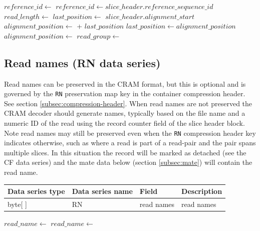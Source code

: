 \documentclass[a4paper]{article}
\begin{document}
\vskip 20pt
\begin{algorithmic}[1]
  \State $reference\_id\gets$ 
\Else
  \State $reference\_id\gets slice\_header.reference\_sequence\_id$
\EndIf
\State $read\_length \gets$ 
        \State $last\_position\gets$ $slice\_header.alignment\_start$
    \EndIf
    \State $alignment\_position \gets$  + $last\_position$
    \State $last\_position \gets alignment\_position$
\Else
    \State $alignment\_position \gets$ 
\EndIf
\State $read\_group \gets$ 
\EndProcedure
\end{algorithmic}

\subsection{Read names (RN data series)}
\label{subsec:names}

Read names can be preserved in the CRAM format, but this is optional and is governed by the \texttt{RN} preservation map key in the container compression header. See section \ref{subsec:compression-header}.
When read names are not preserved the CRAM decoder should generate names, typically based on the file name and a numeric ID of the read using the record counter field of the slice header block.
Note read names may still be preserved even when the \texttt{RN} compression header key indicates otherwise, such as where a read is part of a read-pair and the pair spans multiple slices.
In this situation the record will be marked as detached (see the CF data series) and the mate data below (section \ref{subsec:mate}) will contain the read name.

\begin{tabular}{|>{\raggedright}p{70pt}|>{\raggedright}p{75pt}|>{\raggedright}p{90pt}|>{\raggedright}p{171pt}|}
\hline
\textbf{Data series type} & \textbf{Data series name} & \textbf{Field} & \textbf{Description}\tabularnewline
\hline
byte[ ] & RN & read names & read names\tabularnewline
\hline
\end{tabular}

\vskip 20pt
\begin{algorithmic}[1]
  \State $read\_name \gets$ 
\Else
  \State $read\_name \gets$ 
\EndIf
\Statex
\EndProcedure
\end{algorithmic}
\end{document}

